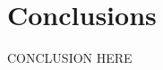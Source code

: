 \documentclass[10pt,twocolumn]{IEEEtran}
\begin{document}








\section{Conclusions}

\color{red}CONCLUSION HERE\color{black}



\end{document}
